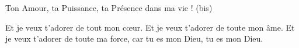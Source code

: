 

Ton Amour, ta Puissance, ta Présence dans ma vie ! (bis)

Et je veux t’adorer de tout mon cœur.
Et je veux t’adorer de toute mon âme.
Et je veux t’adorer de toute ma force,
car tu es mon Dieu, tu es mon Dieu.


